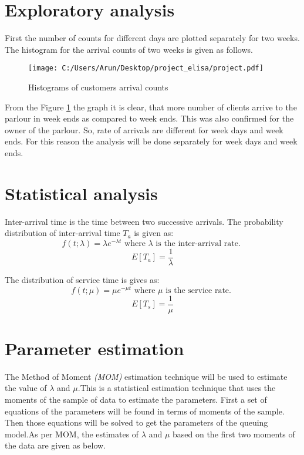 \documentclass{article}
\theoremstyle{definition}
\begin{document}
\section{Exploratory analysis}
First the number of counts for different days are plotted separately for two weeks. The histogram for the arrival counts of two weeks is given as follows.

\begin{figure}[H]
\hspace{1.5cm}
\noindent \texttt{[image: C:/Users/Arun/Desktop/project\_elisa/project.pdf]}{\centering}
\caption{Histograms of customers arrival counts}
\label{fig:hist}
\end{figure}

From the Figure \ref{fig:hist} the graph it is clear, that more number of clients arrive to the parlour in week ends as compared to week ends. This was also confirmed for the owner of the parlour. So, rate of arrivals
are different for week days and week ends. For this reason the analysis will be done separately for week days and week ends.

\section{Statistical analysis}

Inter-arrival time is the time between two successive arrivals. The probability distribution of inter-arrival time $ T_{a} $ is given as:
\begin{equation}
f(t;\lambda)= \lambda e^{-\lambda t}\text{ where }\lambda \text{ is the inter-arrival rate. }
\end{equation}
\begin{equation}
E[T_{a}]=\dfrac{1}{\lambda}
\end{equation}

The distribution of service time is gives as:
\begin{equation}
f(t;\mu)= \mu e^{-\mu t}\text{ where }\mu \text{ is the service rate. }
\end{equation}
\begin{equation}
E[T_{s}]=\dfrac{1}{\mu}
\end{equation}

\section{Parameter estimation}
The Method of Moment \textit{(MOM)} estimation technique will be used to estimate the value of $ \lambda $ and $ \mu $.This is a statistical estimation technique that uses the moments of the sample of data to estimate the parameters. First a set of equations of the parameters will be found in terms of moments of the sample. Then those equations will be solved to get the parameters of the queuing model.As per MOM, the estimates of $ \lambda $ and $ \mu $ based on the first two moments of the data are given as below.
\end{document}

